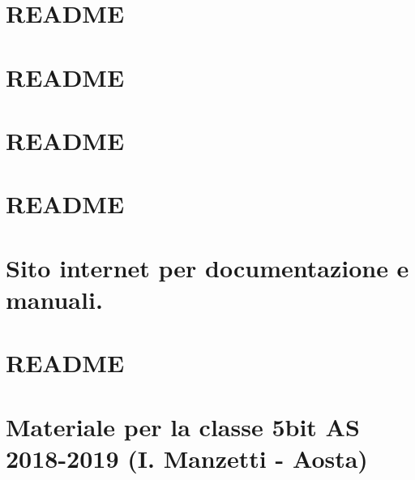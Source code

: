 \documentclass[twoside]{book}
\newcommand{\+}{\discretionary{\mbox{\scriptsize$\hookleftarrow$}}{}{}}
\newcommand{\clearemptydoublepage}{%
  \newpage{\pagestyle{empty}\cleardoublepage}%
}
\begin{document}
\chapter{R\+E\+A\+D\+ME}
\label{md_manuali_sito_etc_README}

\chapter{R\+E\+A\+D\+ME}
\label{md_manuali_sito_images_README}

\chapter{R\+E\+A\+D\+ME}
\label{md_manuali_sito_js_README}

\chapter{R\+E\+A\+D\+ME}
\label{md_manuali_sito_lib_README}

\chapter{Sito internet per documentazione e manuali.}
\label{md_manuali_sito_README}

\chapter{R\+E\+A\+D\+ME}
\label{md_manuali_sito_sub_README}

\chapter{Materiale per la classe 5bit AS 2018-\/2019 (I. Manzetti -\/ Aosta)}
\label{md_README}


\backmatter
\newpage
{}
\clearemptydoublepage
{}
\printindex
\end{document}
